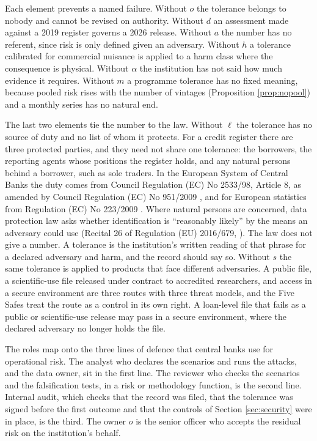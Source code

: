 \documentclass[11pt,a4paper]{article}
\theoremstyle{plain}
\theoremstyle{definition}
\theoremstyle{definition}
\theoremstyle{plain}
\begin{document}
Each element prevents a named failure. Without $o$ the
tolerance belongs to nobody and cannot be revised on authority. Without $d$ an
assessment made against a 2019 register governs a 2026 release. Without $a$ the
number has no referent, since risk is only defined given an adversary. Without
$h$ a tolerance calibrated for commercial nuisance is applied to a harm class
where the consequence is physical. Without $\alpha$ the institution has not
said how much evidence it requires. Without $m$ a programme tolerance has no
fixed meaning, because pooled risk rises with the number of vintages
(Proposition \ref{prop:nopool}) and a monthly series has no natural end.

The last two elements tie the number to the law. Without $\ell$ the tolerance
has no source of duty and no list of whom it protects. For a credit register
there are three protected parties, and they need not share one tolerance: the
borrowers, the reporting agents whose positions the register holds, and any
natural persons behind a borrower, such as sole traders. In the European System
of Central Banks the duty comes from Council Regulation (EC) No 2533/98, Article
8, as amended by Council Regulation (EC) No 951/2009 \citep{ec2533,ec951}, and
for European statistics from Regulation (EC) No 223/2009 \citep{ec223}. Where
natural persons are concerned, data protection law asks whether identification
is ``reasonably likely'' by the means an adversary could use (Recital 26 of
Regulation (EU) 2016/679, \citealp{gdpr2016}). The law does not give a number.
A tolerance is the institution's written reading of that phrase for a declared
adversary and harm, and the record should say so. Without $s$ the same tolerance
is applied to products that face different adversaries. A public file, a
scientific-use file released under contract to accredited researchers, and
access in a secure environment are three routes with three threat models, and
the Five Safes \citep{desai2016} treat the route as a control in its own right.
A loan-level file that fails as a public or scientific-use release may pass in a
secure environment, where the declared adversary no longer holds the file.

The roles map onto the three lines of defence that central banks use for
operational risk. The analyst who declares the scenarios and runs the attacks,
and the data owner, sit in the first line. The reviewer who checks the
scenarios and the falsification tests, in a risk or methodology function, is the
second line. Internal audit, which checks that the record was filed, that the
tolerance was signed before the first outcome and that the controls of Section
\ref{sec:security} were in place, is the third. The owner $o$ is the senior
officer who accepts the residual risk on the institution's behalf.
\end{document}
